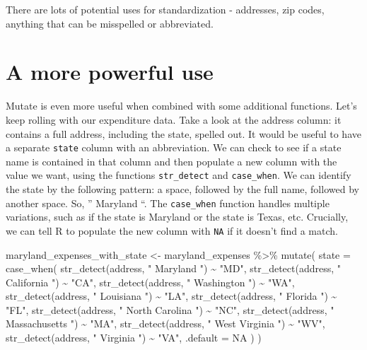 \documentclass[
  letterpaper,
  DIV=11,
  numbers=noendperiod]{scrreprt}
\newenvironment{Shaded}{\begin{snugshade}}{\end{snugshade}}
\newcommand{\AttributeTok}[1]{\textcolor[rgb]{0.40,0.45,0.13}{#1}}
\newcommand{\ConstantTok}[1]{\textcolor[rgb]{0.56,0.35,0.01}{#1}}
\newcommand{\FunctionTok}[1]{\textcolor[rgb]{0.28,0.35,0.67}{#1}}
\newcommand{\NormalTok}[1]{\textcolor[rgb]{0.00,0.23,0.31}{#1}}
\newcommand{\OtherTok}[1]{\textcolor[rgb]{0.00,0.23,0.31}{#1}}
\newcommand{\SpecialCharTok}[1]{\textcolor[rgb]{0.37,0.37,0.37}{#1}}
\newcommand{\StringTok}[1]{\textcolor[rgb]{0.13,0.47,0.30}{#1}}
\begin{document}
There are lots of potential uses for standardization - addresses, zip
codes, anything that can be misspelled or abbreviated.

\hypertarget{a-more-powerful-use}{%
\section{A more powerful use}\label{a-more-powerful-use}}

Mutate is even more useful when combined with some additional functions.
Let's keep rolling with our expenditure data. Take a look at the address
column: it contains a full address, including the state, spelled out. It
would be useful to have a separate \texttt{state} column with an
abbreviation. We can check to see if a state name is contained in that
column and then populate a new column with the value we want, using the
functions \texttt{str\_detect} and \texttt{case\_when}. We can identify
the state by the following pattern: a space, followed by the full name,
followed by another space. So, '' Maryland ``. The \texttt{case\_when}
function handles multiple variations, such as if the state is Maryland
or the state is Texas, etc. Crucially, we can tell R to populate the new
column with \texttt{NA} if it doesn't find a match.

\begin{Shaded}
\begin{Highlighting}[]
\NormalTok{maryland\_expenses\_with\_state }\OtherTok{\textless{}{-}}\NormalTok{ maryland\_expenses }\SpecialCharTok{\%\textgreater{}\%}
  \FunctionTok{mutate}\NormalTok{(}
    \AttributeTok{state =} \FunctionTok{case\_when}\NormalTok{(}
        \FunctionTok{str\_detect}\NormalTok{(address, }\StringTok{" Maryland "}\NormalTok{) }\SpecialCharTok{\textasciitilde{}} \StringTok{"MD"}\NormalTok{,}
        \FunctionTok{str\_detect}\NormalTok{(address, }\StringTok{" California "}\NormalTok{) }\SpecialCharTok{\textasciitilde{}} \StringTok{"CA"}\NormalTok{,}
        \FunctionTok{str\_detect}\NormalTok{(address, }\StringTok{" Washington "}\NormalTok{) }\SpecialCharTok{\textasciitilde{}} \StringTok{"WA"}\NormalTok{,}
        \FunctionTok{str\_detect}\NormalTok{(address, }\StringTok{" Louisiana "}\NormalTok{) }\SpecialCharTok{\textasciitilde{}} \StringTok{"LA"}\NormalTok{,}
        \FunctionTok{str\_detect}\NormalTok{(address, }\StringTok{" Florida "}\NormalTok{) }\SpecialCharTok{\textasciitilde{}} \StringTok{"FL"}\NormalTok{,}
        \FunctionTok{str\_detect}\NormalTok{(address, }\StringTok{" North Carolina "}\NormalTok{) }\SpecialCharTok{\textasciitilde{}} \StringTok{"NC"}\NormalTok{,}
        \FunctionTok{str\_detect}\NormalTok{(address, }\StringTok{" Massachusetts "}\NormalTok{) }\SpecialCharTok{\textasciitilde{}} \StringTok{"MA"}\NormalTok{,}
        \FunctionTok{str\_detect}\NormalTok{(address, }\StringTok{" West Virginia "}\NormalTok{) }\SpecialCharTok{\textasciitilde{}} \StringTok{"WV"}\NormalTok{,}
        \FunctionTok{str\_detect}\NormalTok{(address, }\StringTok{" Virginia "}\NormalTok{) }\SpecialCharTok{\textasciitilde{}} \StringTok{"VA"}\NormalTok{,}
        \AttributeTok{.default =} \ConstantTok{NA}
\NormalTok{      )}
\NormalTok{  )}
\end{Highlighting}
\end{Shaded}
\end{document}
